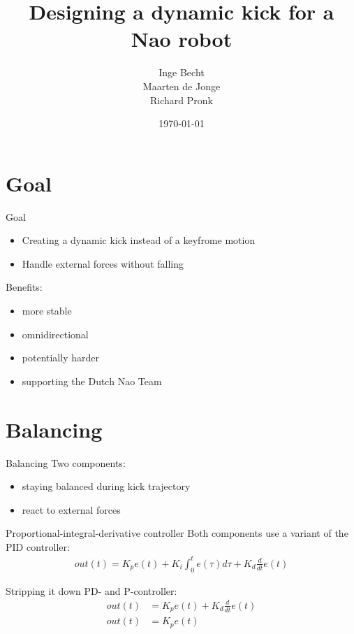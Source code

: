 \documentclass{beamer}
\begin{document}
\title{Designing a dynamic kick for a Nao robot}
\author{Inge Becht \\ Maarten de Jonge \\ Richard Pronk}
\date{\today}


\begin{frame}
  \titlepage
\end{frame}

\section{Goal}
\begin{frame}{Goal}
  \begin{itemize}
    \item Creating a dynamic kick instead of a keyfrome motion
    \item Handle external forces without falling
  \end{itemize}
  \pause
  Benefits:
  \begin{itemize}
    \item more stable
    \item omnidirectional
    \item potentially harder
    \item supporting the Dutch Nao Team
  \end{itemize}
\end{frame}

\section{Balancing}
\begin{frame}{Balancing}
  Two components:
  \begin{itemize}
    \item staying balanced during kick trajectory
    \item react to external forces
  \end{itemize}
\end{frame}

\begin{frame}{Proportional-integral-derivative controller}
  Both components use a variant of the PID controller:
  \begin{align*}
    out(t) = K_p e(t) + K_i \int_{0}^{t} e(\tau) d\tau + K_d \frac{d}{dt} e(t)
  \end{align*}
\end{frame}

\begin{frame}{Stripping it down}
  PD- and P-controller:
  \begin{align*}
    out(t) &= K_p e(t) + K_d \frac{d}{dt} e(t) \\
    out(t) &= K_p e(t)
  \end{align*}
\end{frame}
\end{document}
